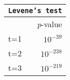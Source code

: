\begin{tabular}{l r}
\toprule
\multicolumn{2}{c}{\texttt{Levene's test}}\\
\midrule
& \textit{p}-value \\
\midrule
t=1 & $10^{-39}$\\
t=2 & $10^{-238}$\\
t=3 & $10^{-219}$\\
\bottomrule
\end{tabular}
